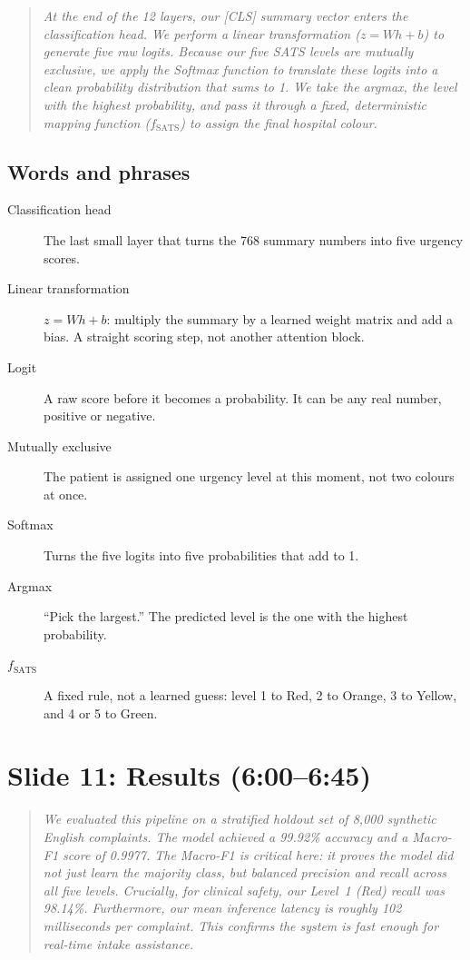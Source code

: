 \documentclass[11pt,a4paper]{article}
\newcommand{\say}[1]{\begin{quote}\itshape #1\end{quote}}
\newcommand{\terms}{\subsection*{Words and phrases}}
\begin{document}
\say{At the end of the 12 layers, our [CLS] summary vector enters the classification head. We perform a linear transformation (\(z = Wh + b\)) to generate five raw logits. Because our five SATS levels are mutually exclusive, we apply the Softmax function to translate these logits into a clean probability distribution that sums to 1. We take the argmax, the level with the highest probability, and pass it through a fixed, deterministic mapping function (\(f_{\mathrm{SATS}}\)) to assign the final hospital colour.}

\terms
\begin{description}
\item[Classification head] The last small layer that turns the 768 summary numbers into five urgency scores.
\item[Linear transformation] \(z = Wh + b\): multiply the summary by a learned weight matrix and add a bias. A straight scoring step, not another attention block.
\item[Logit] A raw score before it becomes a probability. It can be any real number, positive or negative.
\item[Mutually exclusive] The patient is assigned one urgency level at this moment, not two colours at once.
\item[Softmax] Turns the five logits into five probabilities that add to 1.
\item[Argmax] ``Pick the largest.'' The predicted level is the one with the highest probability.
\item[\(f_{\mathrm{SATS}}\)] A fixed rule, not a learned guess: level 1 to Red, 2 to Orange, 3 to Yellow, and 4 or 5 to Green.
\end{description}

\section{Slide 11: Results (6:00--6:45)}

\say{We evaluated this pipeline on a stratified holdout set of 8{,}000 synthetic English complaints. The model achieved a 99.92\% accuracy and a Macro-F1 score of 0.9977. The Macro-F1 is critical here: it proves the model did not just learn the majority class, but balanced precision and recall across all five levels. Crucially, for clinical safety, our Level~1 (Red) recall was 98.14\%. Furthermore, our mean inference latency is roughly 102 milliseconds per complaint. This confirms the system is fast enough for real-time intake assistance.}
\end{document}
